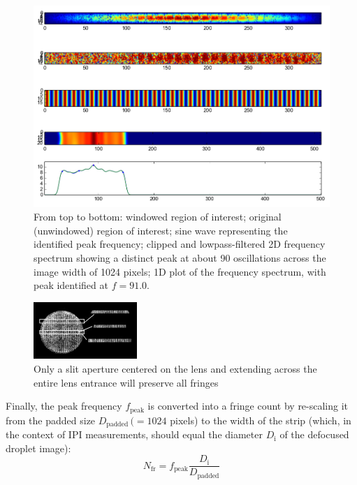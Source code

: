 \documentclass[11.5pt,oneside]{book}
\begin{document}
\begin{figure}[h]
    \centering
    \includegraphics[height=0.38\textheight]{img/globalsizing-dropletpeak.png}
    \caption{From top to bottom: windowed region of interest; original
    (unwindowed) region of interest; sine wave representing the identified peak
frequency; clipped and lowpass-filtered 2D frequency spectrum showing a distinct
peak at about 90 oscillations across the image width of 1024 pixels; 1D plot of
the frequency spectrum, with peak identified at $f=91.0$.}
    \label{fig:globalsizing-dropletpeak}
\end{figure}

\begin{figure}
    \centering
    \includegraphics[width=0.35\textwidth]{img/dropletslitcropping2.jpg}
    \caption{Only a slit aperture centered on the lens and extending across the
    entire lens entrance will preserve all fringes \label{fig:droplet-slitcropping}}
\end{figure}
Finally, the peak frequency $f_\text{peak}$ is converted into a fringe count by re-scaling it
from the padded size $D_\text{padded}\, (= 1024$ pixels) to the width of the strip (which, in the
context of IPI measurements, should equal the diameter $D_\text{i}$ of the defocused droplet
image):
\begin{equation}
    N_\text{fr} = f_\text{peak} \frac{D_\text{i}}{D_\text{padded}}
    \label{fringes-from-diameter}
\end{equation}
\end{document}

